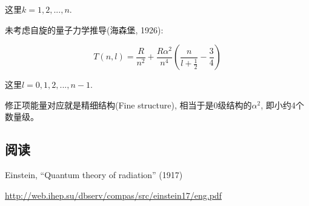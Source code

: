 这里$k=1,2,...,n$.

未考虑自旋的量子力学推导(海森堡, 1926):

\begin{equation*}
T(n,l) = \frac{R}{n^2} + \frac{R\alpha^2}{n^4}\left(
\frac{n}{l+\frac{1}{2}}-\frac{3}{4} \right)
\end{equation*}

这里$l=0,1,2,...,n-1$.


修正项能量对应就是精细结构(Fine structure),
相当于是0级结构的$\alpha^2$, 即小约4个数量级。


\subsection*{阅读}

Einstein, ``Quantum theory of radiation'' (1917)

\url{http://web.ihep.su/dbserv/compas/src/einstein17/eng.pdf}